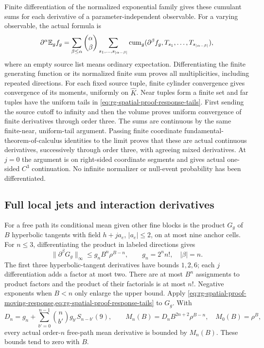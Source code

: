 Finite differentiation of the normalized exponential family gives these
cumulant sums for each derivative of a parameter-independent observable.
For a varying observable, the actual formula is
\begin{equation}
 \partial^\alpha\mathbb E_gf_g
 =\sum_{\beta\le\alpha}{\alpha\choose\beta}
   \sum_{s_1,\ldots,s_{|\alpha-\beta|}}
   \operatorname{cum}_g(\partial^\beta f_g,T_{s_1},\ldots,
                                      T_{s_{|\alpha-\beta|}}),
 \label{eq:rg-spatial-proof-moving-response}
\end{equation}
where an empty source list means ordinary expectation. Differentiating
the finite generating function or its normalized finite sum proves all
multiplicities, including repeated directions. For each fixed source
tuple, finite cylinder convergence gives convergence of its moments,
uniformly on \(\widehat K\). Near tuples form a finite set and far tuples
have the uniform tails in \cref{eq:rg-spatial-proof-response-tails}.
First sending the source cutoff to infinity and then the volume proves
uniform convergence of finite derivatives through order three. The sums
are continuous by the same finite-near, uniform-tail argument. Passing
finite coordinate fundamental-theorem-of-calculus identities to the
limit proves that these are actual continuous derivatives, successively
through order three, with agreeing mixed derivatives. At \(j=0\) the
argument is on right-sided coordinate segments and gives actual one-sided
\(C^3\) continuation. No infinite normalizer or null-event probability
has been differentiated.

\subsection{Full local jets and interaction derivatives}
\label{sec:rg-spatial-proof-local-jets}

For a free path its conditional mean given other fine blocks is the
product \(G_g\) of \(B\) hyperbolic tangents with field
\(h+j a_e\), \(|a_e|\le2\), on at most nine anchor cells. For
\(n\le3\), differentiating the product in labeled directions gives
\begin{equation}
 \|\partial^\beta G_g\|_\infty
 \le g_n B^n\rho^{B-n},\qquad g_n=2^n n!,\quad |\beta|=n.
 \label{eq:rg-spatial-proof-product-jets}
\end{equation}
The first three hyperbolic-tangent derivatives have bounds \(1,2,6\);
each \(j\) differentiation adds a factor at most two. There are at most
\(B^n\) assignments to product factors and the product of their
factorials is at most \(n!\). Negative exponents when \(B<n\) only
enlarge the upper bound. Apply
\cref{eq:rg-spatial-proof-moving-response,eq:rg-spatial-proof-response-tails}
to \(G_g\). With
\begin{equation}
 D_n=g_n+\sum_{b'=0}^{n-1}{n\choose b'}g_{b'}S_{n-b'}(9),\qquad
 M_n(B)=D_nB^{2n+2}\rho^{B-n},\quad M_0(B)=\rho^B,
 \label{eq:rg-spatial-proof-mean-jets}
\end{equation}
every actual order-\(n\) free-path mean derivative is bounded by
\(M_n(B)\). These bounds tend to zero with \(B\).

